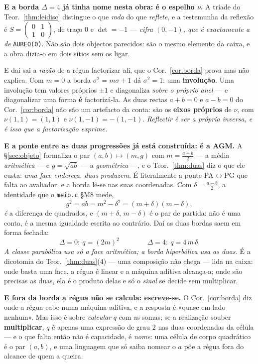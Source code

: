 \documentclass[11pt,a4paper]{article}
\newcommand{\code}[1]{\texttt{\small #1}}
\begin{document}
\medskip\noindent\textbf{E a borda $\Delta=4$ já tinha nome nesta obra: é o
espelho $\nu$.} A tríade do Teor.~\ref{thm:leidisc} distingue o que \emph{roda}
do que \emph{reflete}, e a testemunha da reflexão é
$S=\left(\begin{smallmatrix}0&1\\1&0\end{smallmatrix}\right)$, de traço $0$ e
$\det=-1$ --- \emph{cifra $(0,-1)$, que é exactamente a de} \code{AUREO(0)}. Não
são dois objectos parecidos: são o mesmo elemento da caixa, e a obra dizia-o em
dois sítios sem os ligar.

\noindent E daí sai a \emph{razão} de a régua factorizar ali, que o
Cor.~\ref{cor:borda} prova mas não explica. Com $m=0$ a borda $\sigma^{2}=m\sigma+1$
dá $\sigma^{2}=1$: uma \textbf{involução}. Uma involução tem valores próprios
$\pm1$ e diagonaliza \emph{sobre o próprio anel} --- e diagonalizar uma forma
\textbf{é} factorizá-la. As duas rectas $a+b=0$ e $a-b=0$ do
Cor.~\ref{cor:borda} não são um artefacto da conta: são os \textbf{eixos
próprios} de $\nu$, com $\nu(1,1)=(1,1)$ e $\nu(1,-1)=-(1,-1)$.
\emph{Reflectir é ser a própria inversa, e é isso que a factorização exprime.}

\medskip\noindent\textbf{E a ponte entre as duas progressões já está construída:
é a AGM.} A §\ref{sec:objeto} formaliza o par $(a,b)\mapsto(m,g)$ com
$m=\tfrac{a+b}{2}$ --- a média \emph{aritmética} --- e $g=\sqrt{ab}$ --- a
\emph{geométrica} ---, e o Teor.~\ref{thm:duas} diz o que ele custa: \emph{uma
face endereça, duas produzem}. É literalmente a ponte PA$\leftrightarrow$PG que
falta ao avaliador, e a borda lê-se nas suas coordenadas. Com
$\delta=\tfrac{a-b}{2}$, a identidade que o \code{meio.c} §M8 mede,
\[
g^{2}=ab=m^{2}-\delta^{2}=(m+\delta)(m-\delta),
\]
\emph{é} a diferença de quadrados, e $(m+\delta,\,m-\delta)$ é o par de partida:
não é uma conta, é a mesma igualdade escrita ao contrário. Daí as duas bordas
saem em forma fechada:
\[
\Delta=0:\ q=(2m)^{2}
\qquad\qquad
\Delta=4:\ q=4\,m\,\delta .
\]
\emph{A classe parabólica usa só a face aritmética; a borda hiperbólica usa as
duas.} É a dicotomia do Teor.~\ref{thm:duas}(4) --- uma composição não chega ---
lida na caixa: onde basta uma face, a régua é linear e a máquina aditiva
alcança-a; onde são precisas as duas, ela é o produto delas e só o \emph{sinal}
se decide sem multiplicar.

\medskip\noindent\textbf{E fora da borda a régua não se calcula: escreve-se.} O
Cor.~\ref{cor:borda} diz onde a régua cabe numa máquina aditiva, e a resposta é
«quase em lado nenhum». Mas isso é sobre \emph{calcular} $q$ com as somas; se a
realização souber \textbf{multiplicar}, $q$ é apenas uma expressão de grau $2$ nas
duas coordenadas da célula --- e o que falta então não é capacidade, é
\emph{nome}: uma célula de corpo quadrático é o par $(a,b)$, e uma linguagem que
só saiba nomear o $a$ põe a régua fora do alcance de quem a queira.
\end{document}
